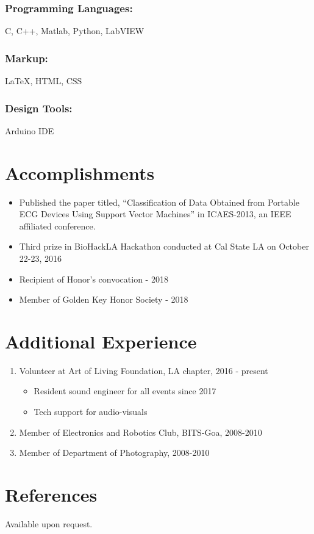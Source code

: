 \documentclass{article}
\begin{document}
\subsubsection{Programming Languages:} 
C, C++, Matlab, Python, LabVIEW
\subsubsection{Markup:} 
{\LaTeX}, HTML, CSS
\subsubsection{Design Tools:} 
Arduino IDE


\section{Accomplishments}
\begin{itemize}
    \item Published the paper titled, “Classification of Data Obtained from Portable ECG Devices Using Support Vector Machines” in ICAES-2013, an IEEE affiliated conference.
    \item Third prize in BioHackLA Hackathon conducted at Cal State LA on October 22-23, 2016
    \item Recipient of Honor's convocation - 2018
    \item Member of Golden Key Honor Society - 2018
\end{itemize}

\section{Additional Experience}
\begin{enumerate}
    \item Volunteer at Art of Living Foundation, LA chapter, 2016 - present
    \begin{itemize}
        \item Resident sound engineer for all events since 2017
        \item Tech support for audio-visuals
    \end{itemize}
    \item Member of Electronics and Robotics Club, BITS-Goa, 2008-2010
    \item Member of Department of Photography, 2008-2010
\end{enumerate}

\section{References}
Available upon request.
\end{document}
